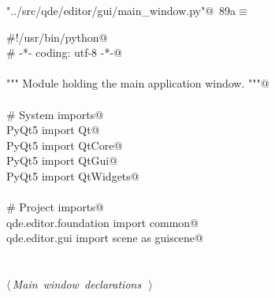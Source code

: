 \documentclass[
    a4paper,      %
    10pt,         %
    openright,    %
    notitlepage,  %
    parskip=half, %
]{scrreprt}       %
\theoremstyle{definition}                    %
\begin{document}
\begin{flushleft} \small
\begin{minipage}{\linewidth}\label{scrap140}\raggedright\small
{} \verb@"../src/qde/editor/gui/main_window.py"@\nobreak\ {\footnotesize {89a}}$\equiv$
\vspace{-1ex}
\begin{list}{}{} \item
\mbox{}\lstinline@#!/usr/bin/python@\\
\mbox{}\lstinline@# -*- coding: utf-8 -*-@\\
\mbox{}\lstinline@@\\
\mbox{}\lstinline@""" Module holding the main application window. """@\\
\mbox{}\lstinline@@\\
\mbox{}\lstinline@# System imports@\\
\mbox{}\lstinline@from PyQt5 import Qt@\\
\mbox{}\lstinline@from PyQt5 import QtCore@\\
\mbox{}\lstinline@from PyQt5 import QtGui@\\
\mbox{}\lstinline@from PyQt5 import QtWidgets@\\
\mbox{}\lstinline@@\\
\mbox{}\lstinline@# Project imports@\\
\mbox{}\lstinline@from qde.editor.foundation import common@\\
\mbox{}\lstinline@from qde.editor.gui import scene as guiscene@\\
\mbox{}\lstinline@@\\
\mbox{}\lstinline@@\\
\mbox{}\lstinline@@\hbox{$\langle\,${\itshape Main window declarations}\nobreak\ {\footnotesize {}}$\,\rangle$}\lstinline@@\\
\mbox{}\lstinline@@{\NWsep}
\end{list}
\vspace{-1.5ex}
\footnotesize
\begin{list}{}{\setlength{\itemsep}{-\parsep}\setlength{\itemindent}{-\leftmargin}}

\item{}
\end{list}
\end{minipage}\vspace{4ex}
\end{flushleft}
\end{document}
